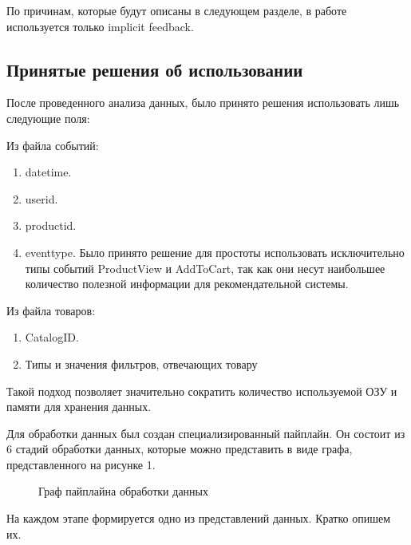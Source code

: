 \documentclass[14pt]{mmcs_article}
\newenvironment{myenumerate}
{ \begin{enumerate}
		\setlength{\itemsep}{0pt}
		\setlength{\parskip}{0pt}
		\setlength{\parsep}{0pt}     }
	{ \end{enumerate}                  }
\begin{document}
По причинам, которые будут описаны в следующем разделе, в работе используется только implicit feedback.

\subsection{Принятые решения об использовании}

После проведенного анализа данных, было принято решения использовать лишь следующие поля:

Из файла событий:

\begin{myenumerate}
		\item datetime.
		\item userid. 
		\item productid.
		\item eventtype. Было принято решение для простоты использовать исключительно типы событий ProductView и AddToCart, так как они несут наибольшее количество полезной информации для рекомендательной системы. 
\end{myenumerate}

Из файла товаров:

\begin{myenumerate}
	\item CatalogID.
	\item Типы и значения фильтров, отвечающих товару
\end{myenumerate}

Такой подход позволяет значительно сократить количество используемой ОЗУ и памяти для хранения данных.

Для обработки данных был создан специализированный пайплайн. Он состоит из 6 стадий обработки данных, которые можно представить в виде графа, представленного на рисунке 1. 

\begin{figure}[H]
\caption{Граф пайплайна обработки данных}\label{stud:fig:2}
\end{figure}
На каждом этапе формируется одно из представлений данных. Кратко опишем их.
\end{document}

